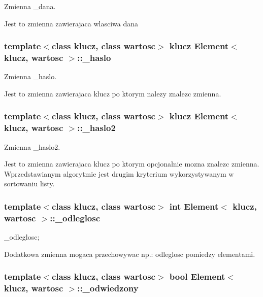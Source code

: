 Zmienna \+\_\+dana. 

Jest to zmienna zawierajaca wlasciwa dana \hypertarget{class_element_a5adc6eefcea4421879ba7f69960f3d2d}{
\subsubsection[{\+\_\+haslo}]{\setlength{\rightskip}{0pt plus 5cm}template$<$class klucz, class wartosc$>$ klucz {\bf Element}$<$ klucz, wartosc $>$\+::\+\_\+haslo\hspace{0.3cm}{\ttfamily [private]}}}\label{class_element_a5adc6eefcea4421879ba7f69960f3d2d}


Zmienna \+\_\+haslo. 

Jest to zmienna zawierajaca klucz po ktorym nalezy znalezc zmienna. \hypertarget{class_element_a0428d3ef2e3ba02dc3c116f900b41f7f}{
\subsubsection[{\+\_\+haslo2}]{\setlength{\rightskip}{0pt plus 5cm}template$<$class klucz, class wartosc$>$ klucz {\bf Element}$<$ klucz, wartosc $>$\+::\+\_\+haslo2\hspace{0.3cm}{\ttfamily [private]}}}\label{class_element_a0428d3ef2e3ba02dc3c116f900b41f7f}


Zmienna \+\_\+haslo2. 

Jest to zmienna zawierajaca klucz po ktorym opcjonalnie mozna znalezc zmienna. Wprzedstawianym algorytmie jest drugim kryterium wykorzystywanym w sortowaniu listy. \hypertarget{class_element_a206cb0915829707e829395aa1c320eca}{
\subsubsection[{\+\_\+odleglosc}]{\setlength{\rightskip}{0pt plus 5cm}template$<$class klucz, class wartosc$>$ int {\bf Element}$<$ klucz, wartosc $>$\+::\+\_\+odleglosc\hspace{0.3cm}{\ttfamily [private]}}}\label{class_element_a206cb0915829707e829395aa1c320eca}


\+\_\+odleglosc; 

Dodatkowa zmienna mogaca przechowywac np.\+: odleglosc pomiedzy elementami. \hypertarget{class_element_a78bb5917b236378b74436d5c2471d724}{
\subsubsection[{\+\_\+odwiedzony}]{\setlength{\rightskip}{0pt plus 5cm}template$<$class klucz, class wartosc$>$ bool {\bf Element}$<$ klucz, wartosc $>$\+::\+\_\+odwiedzony\hspace{0.3cm}{\ttfamily [private]}}}\label{class_element_a78bb5917b236378b74436d5c2471d724}


